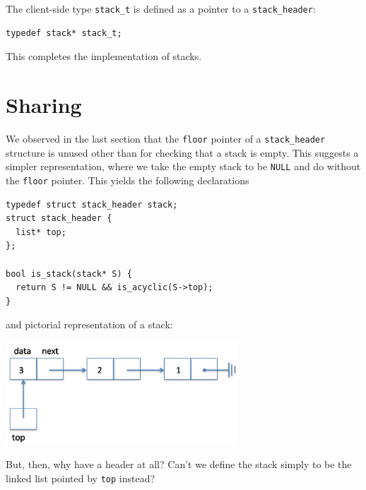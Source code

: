 The client-side type \lstinline'stack_t' is defined as a pointer to a
\lstinline'stack_header':
\begin{lstlisting}[language={[C0]C}]
typedef stack* stack_t;
\end{lstlisting}

\noindent
This completes the implementation of stacks.


\section{Sharing}
\label{sec:linkedlist:sharing}

We observed in the last section that the \lstinline'floor' pointer of
a \lstinline'stack_header' structure is unused other than for checking
that a stack is empty.  This suggests a simpler representation, where
we take the empty stack to be \lstinline'NULL' and do without the
\lstinline'floor' pointer.  This yields the following declarations
\begin{lstlisting}[language={[C0]C}]
typedef struct stack_header stack;
struct stack_header {
  list* top;
};

bool is_stack(stack* S) {
  return S != NULL && is_acyclic(S->top);
}
\end{lstlisting}
and pictorial representation of a stack:
\begin{center}
\includegraphics[width=0.65\textwidth]{img/stackB.png}
\end{center}
But, then, why have a header at all?  Can't we define the stack simply
to be the linked list pointed by \lstinline'top' instead?


